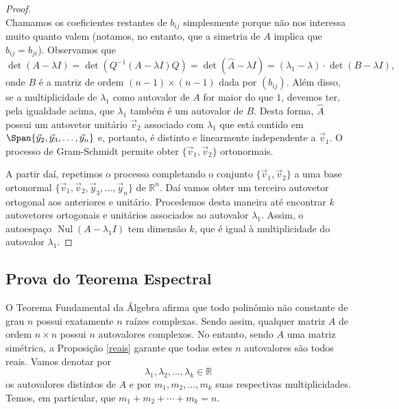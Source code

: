 \begin{proof}
\begin{equation}
	\end{equation} Chamamos os coeficientes restantes de $b_{ij}$ simplesmente porque não nos interessa muito quanto valem (notamos, no entanto, que a simetria de $A$ implica que $b_{ij} = b_{ji}$). Observamos que
	\begin{equation}
	\det \left( A - \lambda I \right) = \det \left( Q^{-1} (A - \lambda I) Q \right) =	\det \left( \hat{A} - \lambda I \right) = (\lambda_1 - \lambda) \cdot \det (B - \lambda I),
	\end{equation} onde $B$ é a matriz de ordem $(n-1)\times (n-1)$ dada por $(b_{ij})$. Além disso, se a multiplicidade de $\lambda_1$ como autovalor de $A$ for maior do que $1$, devemos ter, pela igualdade acima, que $\lambda_1$ também é um autovalor de $B$. Desta forma, $\hat{A}$ possui um autovetor unitário $\vec{v}_2$ associado com $\lambda_1$ que está contido em $\Span \{ \vec{y}_2, \vec{y}_3, \dots, \vec{y}_n \}$ e, portanto, é distinto e linearmente independente a $\vec{v}_1$. O processo de Gram-Schmidt permite obter $\{\vec{v}_1, \vec{v}_2\}$ ortonormais.

	A partir daí, repetimos o processo completando o conjunto $\{\vec{v}_1, \vec{v}_2\}$ a uma base ortonormal $\{ \vec{v}_1, \vec{v}_2, \vec{y}_3, \dots, \vec{y}_n \}$ de $\mathbb{R}^n$. Daí vamos obter um terceiro autovetor ortogonal aos anteriores e unitário. Procedemos desta maneira até encontrar $k$ autovetores ortogonais e unitários associados ao autovalor $\lambda_1$. Assim, o autoespaço $\operatorname{Nul} (A - \lambda_1 I)$ tem dimensão $k$, que é igual à multiplicidade do autovalor $\lambda_1$.
\end{proof}

\subsection{Prova do Teorema Espectral}

O Teorema Fundamental da Álgebra afirma que todo polinômio não constante de grau $n$ possui exatamente $n$ raízes complexas. Sendo assim, qualquer matriz $A$ de ordem $n\times n$ possui $n$ autovalores complexos. No entanto, sendo $A$ uma matriz simétrica, a Proposição \ref{reais} garante que todas estes $n$ autovalores são todos reais. Vamos denotar por
\begin{equation}
\lambda_1, \lambda_2, \dots, \lambda_k \in \mathbb{R}
\end{equation} os autovalores distintos de $A$ e por $m_1, m_2, \dots, m_k$ suas respectivas multiplicidades. Temos, em particular, que $m_1 + m_2 + \cdots + m_k = n$.

